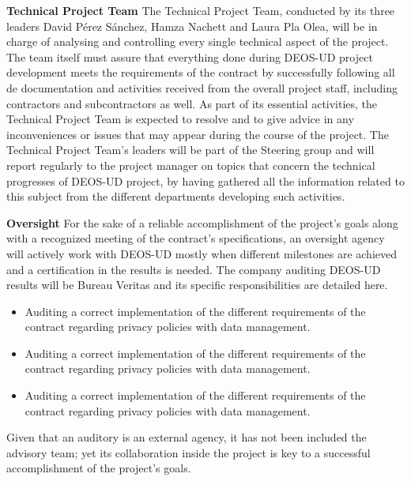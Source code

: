 \textbf{Technical Project Team}
\newline
\newline
The Technical Project Team, conducted by its three leaders David Pérez Sánchez, Hamza Nachett and Laura Pla Olea, will be in charge of analysing and controlling every single technical aspect of the project. The team itself must assure that everything done during DEOS-UD project development meets the requirements of the contract by successfully following all de documentation and activities received from the overall project staff, including contractors and subcontractors as well. As part of its essential activities, the Technical Project Team is expected to resolve and to give advice in any inconveniences or issues that may appear during the course of the project. 
The Technical Project Team’s leaders will be part of the Steering group and will report regularly to the project manager on topics that concern the technical progresses of DEOS-UD project, by having gathered all the information related to this subject from the different departments developing such activities. 

\textbf{Oversight }
\newline
\newline
For the sake of a reliable accomplishment of the project’s goals along with a recognized meeting of the contract’s specifications, an oversight agency will actively work with DEOS-UD mostly when different milestones are achieved and a certification in the results is needed. The company auditing DEOS-UD results will be Bureau Veritas and its specific responsibilities are detailed here.
 \begin{itemize}
	\item 	Auditing a correct implementation of the different requirements of the contract regarding privacy policies with data management. 
	\item 	Auditing a correct implementation of the different requirements of the contract regarding privacy policies with data management. 
	\item 	Auditing a correct implementation of the different requirements of the contract regarding privacy policies with data management. 
\end{itemize}
Given that an auditory is an external agency, it has not been included the advisory team; yet its collaboration inside the project is key to a successful accomplishment of the project’s goals. 
